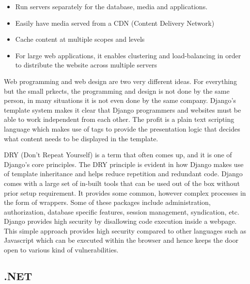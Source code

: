\documentclass[../thesis.tex]{subfiles}
\begin{document}
\begin{itemize}
	\item  Run servers separately for the database, media and applications.
	\newline
    
	\item  Easily have media served from a CDN (Content Delivery Network)
	\newline
    
	\item  Cache content at multiple scopes and levels
	\newline
    
	\item  For large web applications, it enables clustering and load-balancing in order to distribute the website across multiple servers
    
\end{itemize}
Web programming and web design are two very different ideas. For everything but the small prkects, the programming and design is not done by the same person, in many situations it is not even done by the same company. Django's template system makes it clear that Django programmers and websites must be able to work independent from each other. The profit is a plain text scripting language which makes use of tags to provide the presentation logic that decides what content needs to be displayed in the template.

DRY (Don't Repeat Yourself) is a term that often comes up, and it is one of Django's core principles. The DRY principle is evident in how Django makes use of template inheritance and helps reduce repetition and redundant code. Django comes with a large set of in-built tools that can be used out of the box without prior setup requirement. It provides some common, however complex processes in the form of wrappers. Some of these packages include administration, authorization, database specific features, session management, syndication, etc.
Django provides high security by disallowing code execution inside a webpage. This simple approach provides high security compared to other languages such as Javascript which can be executed within the browser and hence keeps the door open to various kind of vulnerabilities.



\subsection{.NET}
    
\end{document}
